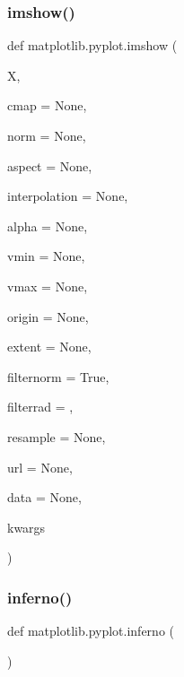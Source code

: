 \subsubsection{\texorpdfstring{imshow()}{imshow()}}
{\footnotesize\ttfamily def matplotlib.\+pyplot.\+imshow (\begin{DoxyParamCaption}\item[{}]{X,  }\item[{}]{cmap = {\ttfamily None},  }\item[{}]{norm = {\ttfamily None},  }\item[{}]{aspect = {\ttfamily None},  }\item[{}]{interpolation = {\ttfamily None},  }\item[{}]{alpha = {\ttfamily None},  }\item[{}]{vmin = {\ttfamily None},  }\item[{}]{vmax = {\ttfamily None},  }\item[{}]{origin = {\ttfamily None},  }\item[{}]{extent = {\ttfamily None},  }\item[{}]{filternorm = {\ttfamily True},  }\item[{}]{filterrad = {},  }\item[{}]{resample = {\ttfamily None},  }\item[{}]{url = {\ttfamily None},  }\item[{}]{data = {\ttfamily None},  }\item[{}]{kwargs }\end{DoxyParamCaption})}

\mbox{\label{namespacematplotlib_1_1pyplot_a81b75531518d0f84acd4edd8eb14c902}} 
\subsubsection{\texorpdfstring{inferno()}{inferno()}}
{\footnotesize\ttfamily def matplotlib.\+pyplot.\+inferno (\begin{DoxyParamCaption}{ }\end{DoxyParamCaption})}

\mbox{\label{namespacematplotlib_1_1pyplot_a64e5c8db0d4e8dc318605ceb2318c58a}} 
